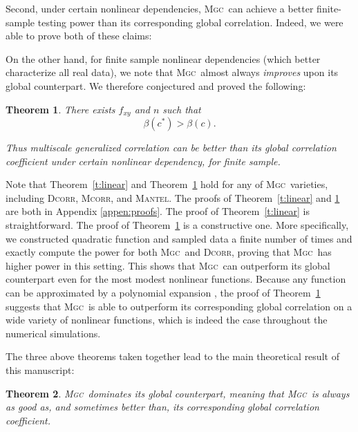 \documentclass[11pt]{article}
\newcommand{\note}[2][]{\added[#1,remark={#2}]{}}
\providecommand{\sct}[1]{{\normalfont\textsc{#1}}}
\newcommand{\G}{c}
\newcommand{\Mgc}{\sct{Mgc}}
\newcommand{\Dcorr}{\sct{Dcorr}}
\newcommand{\Mcorr}{\sct{Mcorr}}
\newcommand{\Mantel}{\sct{Mantel}}
\newcommand{\jv}[1]{{\note{jv: #1}}}
\newcommand{\cs}[1]{{\note{cs: #1}}}
\newtheorem{thm}{Theorem}
\begin{document}
Second, under certain nonlinear dependencies, \Mgc~can achieve a better finite-sample testing power than its corresponding global correlation. Indeed, we were able to prove both of these claims:


On the other hand, for finite sample nonlinear dependencies (which better characterize all real data), we note that \Mgc~almost always \emph{improves} upon its global counterpart.  We therefore conjectured and proved the following:
\begin{thm}
\label{t:non}
There exists $f_{xy}$ and $n$ such that
\begin{equation}
\beta(\G^{*}) > \beta(\G).
\end{equation}

Thus multiscale generalized correlation can be better than its global correlation coefficient under certain nonlinear dependency, for finite sample.
\end{thm}
Note that Theorem~\ref{t:linear} and Theorem~\ref{t:non} hold for any of \Mgc~varieties, including  \Dcorr, \Mcorr, and \Mantel.
%
The proofs of Theorem~\ref{t:linear} and \ref{t:non} are both in Appendix \ref{appen:proofs}.  The proof of Theorem~\ref{t:linear} is straightforward.  The proof of Theorem~\ref{t:non} is a constructive one. More specifically, we constructed quadratic function and sampled data a finite number of times and exactly compute the power for both \Mgc~and \Dcorr, proving that \Mgc~has higher power in this setting. This shows that \Mgc~can outperform its global counterpart even for the most modest nonlinear functions.  Because any function can be approximated by a polynomial expansion \cite{RudinBook}, the proof of Theorem~\ref{t:non} suggests that \Mgc~is able to outperform its corresponding global correlation on a wide variety of nonlinear functions, which is indeed the case throughout the numerical simulations. %
\cs{is that true?}
\jv{no, that is too general a claim to be true, so I commented out. For example, dcorr=1 under any linear dependency, is also a finite sample theorem and easy to prove.}

The three above theorems taken together lead to the main theoretical result of this manuscript:
\begin{thm}
\Mgc~dominates its global counterpart, meaning that \Mgc~is always as good as, and sometimes better than, its corresponding global correlation coefficient. 
\end{thm}
\end{document}
